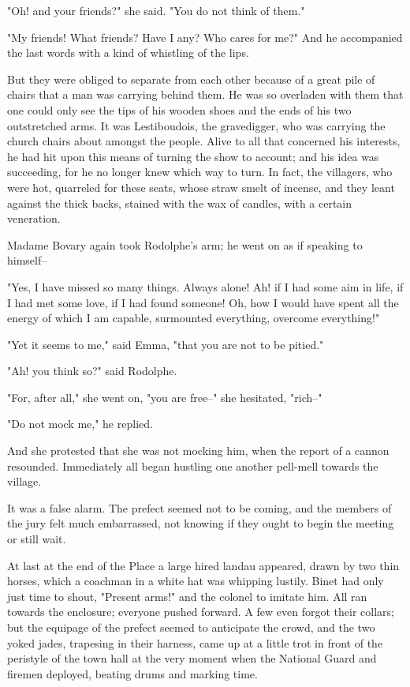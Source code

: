\documentclass[11pt,twocolumn]{ltugboat}
\begin{document}
"Oh! and your friends?" she said. "You do not think of them."

"My friends! What friends? Have I any? Who cares for me?" And he
accompanied the last words with a kind of whistling of the lips.

But they were obliged to separate from each other because of a great
pile of chairs that a man was carrying behind them. He was so overladen
with them that one could only see the tips of his wooden shoes and the
ends of his two outstretched arms. It was Lestiboudois, the gravedigger,
who was carrying the church chairs about amongst the people. Alive to
all that concerned his interests, he had hit upon this means of turning
the show to account; and his idea was succeeding, for he no longer knew
which way to turn. In fact, the villagers, who were hot, quarreled for
these seats, whose straw smelt of incense, and they leant against the
thick backs, stained with the wax of candles, with a certain veneration.

Madame Bovary again took Rodolphe's arm; he went on as if speaking to
himself--

"Yes, I have missed so many things. Always alone! Ah! if I had some aim
in life, if I had met some love, if I had found someone! Oh, how I would
have spent all the energy of which I am capable, surmounted everything,
overcome everything!"

"Yet it seems to me," said Emma, "that you are not to be pitied."

"Ah! you think so?" said Rodolphe.

"For, after all," she went on, "you are free--" she hesitated, "rich--"

"Do not mock me," he replied.

And she protested that she was not mocking him, when the report of a
cannon resounded. Immediately all began hustling one another pell-mell
towards the village.

It was a false alarm. The prefect seemed not to be coming, and the
members of the jury felt much embarrassed, not knowing if they ought to
begin the meeting or still wait.

At last at the end of the Place a large hired landau appeared, drawn by
two thin horses, which a coachman in a white hat was whipping lustily.
Binet had only just time to shout, "Present arms!" and the colonel to
imitate him. All ran towards the enclosure; everyone pushed forward. A
few even forgot their collars; but the equipage of the prefect seemed
to anticipate the crowd, and the two yoked jades, trapesing in their
harness, came up at a little trot in front of the peristyle of the town
hall at the very moment when the National Guard and firemen deployed,
beating drums and marking time.
\end{document}

